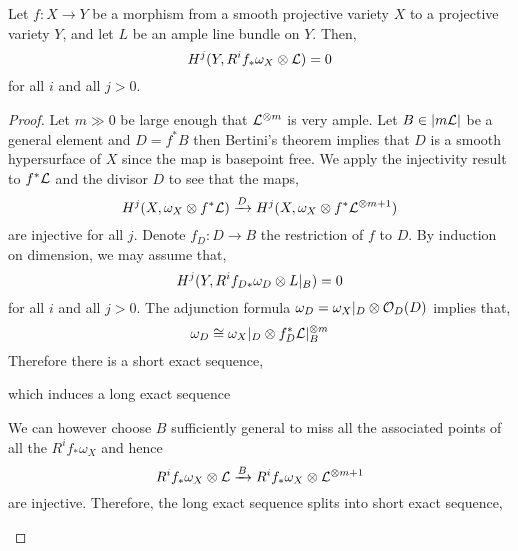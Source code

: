 \documentclass[12pt]{article}
\begin{document}
\begin{theorem}
Let $f : X \to Y$ be a morphism from a smooth projective variety $X$ to a projective variety $Y$, and let $L$ be an ample line bundle on $Y$. Then,
\[ H^j(Y, R^i f_* \omega_X \otimes \mathcal{L}) = 0 \]
for all $i$ and all $j > 0$.
\end{theorem}

\begin{proof}
Let $m \gg 0$ be large enough that $\mathcal{L}^{\otimes m}$ is very ample. Let $B \in | m \mathcal{L} |$ be a general element and $D = f^* B$ then Bertini's theorem implies that $D$ is a smooth hypersurface of $X$ since the map is basepoint free. We apply the injectivity result to $f^* \mathcal{L}$ and the divisor $D$ to see that the maps,
\[ H^j(X, \omega_X \otimes f^* \mathcal{L}) \xrightarrow{D} H^j(X, \omega_X \otimes f^* \mathcal{L}^{\otimes m + 1}) \] 
are injective for all $j$. Denote $f_D : D \to B$ the restriction of $f$ to $D$. By induction on dimension, we may assume that,
\[ H^j(Y, R^i f_{D*} \omega_D \otimes L|_B) = 0 \]
for all $i$ and all $j > 0$. The adjunction formula $\omega_D = \omega_X|_D \otimes \mathcal{O}_{D}(D)$ implies that,
\[ \omega_D \cong \omega_X|_D \otimes f_D^* \mathcal{L}|_B^{\otimes m} \]
Therefore there is a short exact sequence,
\begin{center}
\end{center}
which induces a long exact sequence
\begin{center}
\end{center}
We can however choose $B$ sufficiently general to miss all the associated points of all the $R^i f_* \omega_X$ and hence
\[ R^i f_* \omega_X \otimes \mathcal{L} \xrightarrow{B} R^i f_* \omega_X \otimes \mathcal{L}^{\otimes m+1} \]
are injective. Therefore, the long exact sequence splits into short exact sequence,
\begin{center}
\end{center}

\end{proof}
\end{document}

